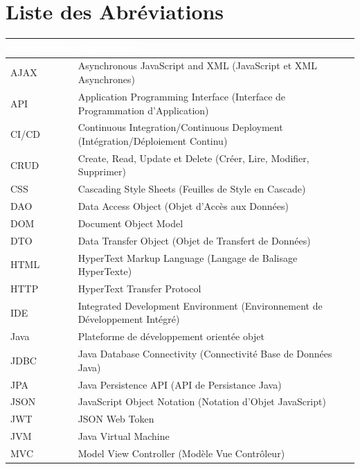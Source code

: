 \documentclass[12pt,a4paper]{report}
\begin{document}
\chapter*{Liste des Abréviations}

\begin{longtable}[]{@{}
  >{\raggedright\arraybackslash}p{}
  >{\raggedright\arraybackslash}p{}@{}}
\toprule
\rowcolor{capgeminiblue}
\textcolor{white}{\textbf{Abréviation}} & \textcolor{white}{\textbf{Signification}} \\
\midrule
\endhead
\rowcolor{lightgray}
AJAX & Asynchronous JavaScript and XML (JavaScript et XML Asynchrones) \\
API & Application Programming Interface (Interface de Programmation d'Application) \\
\rowcolor{lightgray}
CI/CD & Continuous Integration/Continuous Deployment (Intégration/Déploiement Continu) \\
CRUD & Create, Read, Update et Delete (Créer, Lire, Modifier, Supprimer) \\
\rowcolor{lightgray}
CSS & Cascading Style Sheets (Feuilles de Style en Cascade) \\
DAO & Data Access Object (Objet d'Accès aux Données) \\
\rowcolor{lightgray}
DOM & Document Object Model \\
DTO & Data Transfer Object (Objet de Transfert de Données) \\
\rowcolor{lightgray}
HTML & HyperText Markup Language (Langage de Balisage HyperTexte) \\
HTTP & HyperText Transfer Protocol \\
\rowcolor{lightgray}
IDE & Integrated Development Environment (Environnement de Développement Intégré) \\
Java & Plateforme de développement orientée objet \\
\rowcolor{lightgray}
JDBC & Java Database Connectivity (Connectivité Base de Données Java) \\
JPA & Java Persistence API (API de Persistance Java) \\
\rowcolor{lightgray}
JSON & JavaScript Object Notation (Notation d'Objet JavaScript) \\
JWT & JSON Web Token \\
\rowcolor{lightgray}
JVM & Java Virtual Machine \\
MVC & Model View Controller (Modèle Vue Contrôleur) \\

\end{longtable}
\end{document}

